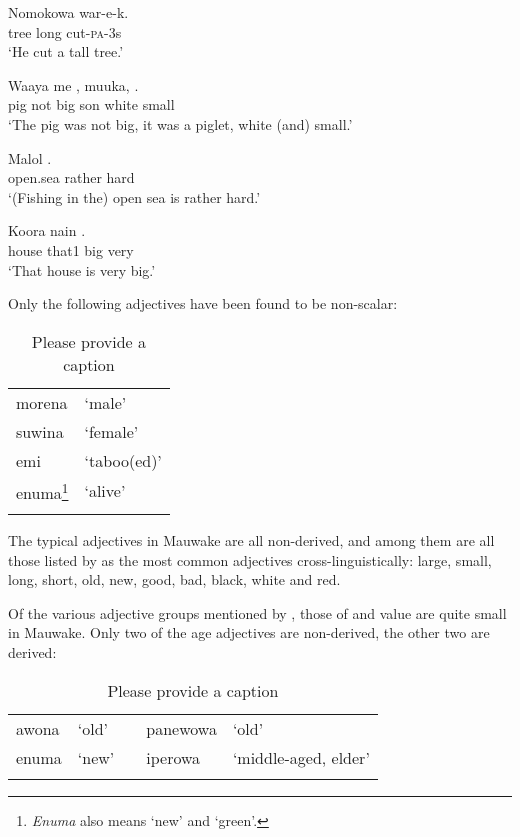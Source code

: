 \ea%
\label{ex:3:x70}
\gll Nomokowa  war-e-k. \\
tree long cut-\textsc{pa}-3s\\
\glt`He cut a tall tree.'
\z

\ea%
\label{ex:3:x71}
\gll Waaya me , muuka,  . \\
pig not big son white small\\
\glt`The pig was not big, it was a piglet, white (and) small.'
\z

\ea%
\label{ex:3:x72}
\gll Malol  . \\
open.sea rather hard\\
\glt`(Fishing in the) open sea is rather hard.'
\z

\ea%
\label{ex:3:x73}
\gll Koora nain  . \\
house that1 big very\\
\glt`That house is very big.'
\z

Only the following adjectives have been found to be non-scalar:

\begin{table}
\caption{Please provide a caption}
\label{}
\begin{tabular}{ll}
\mytoprule
morena &`male'\\
suwina &`female'\\
emi &`taboo(ed)'\\
enuma\footnote{\textit{Enuma} also means `new' and `green'.} &`alive'\\
\mybottomrule
\end{tabular}
\end{table}

The typical adjectives in Mauwake are all non-derived, and among them are all those listed by \citet[23]{Dixon1977} as the most common adjectives cross-linguistically: large, small, long, short, old, new, good, bad, black, white and red.

Of the various adjective groups mentioned by \citet{Dixon1977}, those of  and value are quite small in Mauwake. Only two of the age adjectives are non-derived, the other two are derived:

\begin{table}
\caption{Please provide a caption}
\label{}
\begin{tabular}{llcll}
\mytoprule
awona &`old' && panewowa &`old'\\
enuma &`new' && iperowa &`middle-aged, elder'\\ 
\mybottomrule
\end{tabular}
\end{table}

